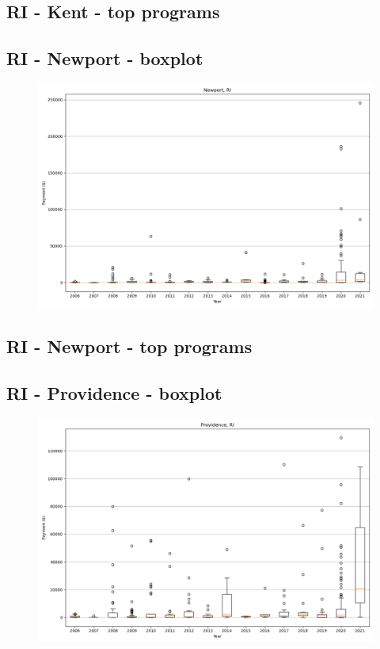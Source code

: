 \subsection*{RI - Kent - top programs}

\newpage
\subsection*{RI - Newport - boxplot}
\begin{figure}[h]
\centering
\includegraphics[width=7in]{../output/boxplots/counties/Newport-RI_boxplot.png}
\end{figure}


\subsection*{RI - Newport - top programs}

\newpage
\subsection*{RI - Providence - boxplot}
\begin{figure}[h]
\centering
\includegraphics[width=7in]{../output/boxplots/counties/Providence-RI_boxplot.png}
\end{figure}


